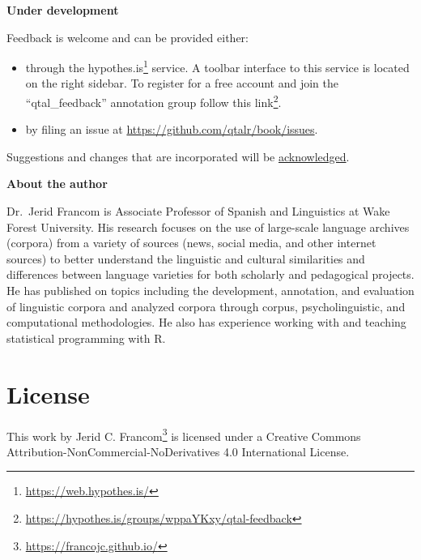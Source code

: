 \documentclass[
  letterpaper,
]{latex/krantz}
\providecommand{\tightlist}{%
  \setlength{\itemsep}{0pt}\setlength{\parskip}{0pt}}\usepackage{longtable,booktabs,array}
\DeclareRobustCommand{\href}[2]{#2\footnote{\url{#1}}}
\begin{document}
\begin{tcolorbox}[enhanced jigsaw, arc=.35mm, leftrule=.75mm, rightrule=.15mm, opacityback=0, colback=white, breakable, bottomrule=.15mm, left=2mm, toprule=.15mm]

\textbf{ Under development}\vspace{2mm}

Feedback is welcome and can be provided either:

\begin{itemize}
\tightlist
\item
  through the \href{https://web.hypothes.is/}{hypothes.is} service. A
  toolbar interface to this service is located on the right sidebar. To
  register for a free account and join the ``qtal\_feedback'' annotation
  group \href{https://hypothes.is/groups/wppaYKxy/qtal-feedback}{follow
  this link}.
\item
  by filing an issue at \url{https://github.com/qtalr/book/issues}.
\end{itemize}

Suggestions and changes that are incorporated will be
\protect\hyperlink{acknowledgements}{acknowledged}.

\end{tcolorbox}

\textbf{About the author}

Dr.~Jerid Francom is Associate Professor of Spanish and Linguistics at
Wake Forest University. His research focuses on the use of large-scale
language archives (corpora) from a variety of sources (news, social
media, and other internet sources) to better understand the linguistic
and cultural similarities and differences between language varieties for
both scholarly and pedagogical projects. He has published on topics
including the development, annotation, and evaluation of linguistic
corpora and analyzed corpora through corpus, psycholinguistic, and
computational methodologies. He also has experience working with and
teaching statistical programming with R.

\hypertarget{license}{%
\section*{License}\label{license}}


This work by \href{https://francojc.github.io/}{Jerid C. Francom} is
licensed under a Creative Commons
Attribution-NonCommercial-NoDerivatives 4.0 International License.
\end{document}
